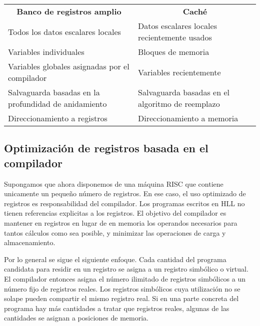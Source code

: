 \begin{table}[h]
  \centering
  \begin{tabular}{|l|l|}
    \cline{1-2}
    \multicolumn{1}{|c|}{\textbf{Banco de registros amplio}} & \multicolumn{1}{c|}{\textbf{Caché}} \\ \cline{1-2}
                                                             Todos los datos escalares locales & Datos escalares locales recientemente usados \\ \cline{1-2}
                                                             Variables individuales & Bloques de memoria \\ \cline{1-2}
                                                             Variables globales asignadas por el compilador & Variables recientemente \\ \cline{1-2}
                                                             Salvaguarda basadas en la profundidad de anidamiento & Salvaguarda basadas en el algoritmo de reemplazo \\ \cline{1-2}
                                                             Direccionamiento a registros & Direccionamiento a memoria \\ \cline{1-2}
  \end{tabular}
\end{table}

\subsection{Optimización de registros basada en el compilador}

Supongamos que ahora disponemos de una máquina RISC que contiene unicamente un pequeño número de registros. En ese caso, el uso optimizado de registros es responsabilidad del compilador. Los programas escritos en HLL no tienen referencias explicitas a los registros. El objetivo del compilador es mantener en registros en lugar de en memoria los operandos necesarios para tantos cálculos como sea posible, y minimizar las operaciones de carga y almacenamiento.

Por lo general se sigue el siguiente enfoque. Cada cantidad del programa candidata para residir en un registro se asigna a un registro simbólico o virtual. El compilador entonces asigna el número ilimitado de registros simbólicos a un número fijo de registros reales. Los registros simbólicos cuya utilización no se solape pueden compartir el mismo registro real. Si en una parte concreta del programa hay más cantidades a tratar que registros reales, algunas de las cantidades se asignan a posiciones de memoria.

